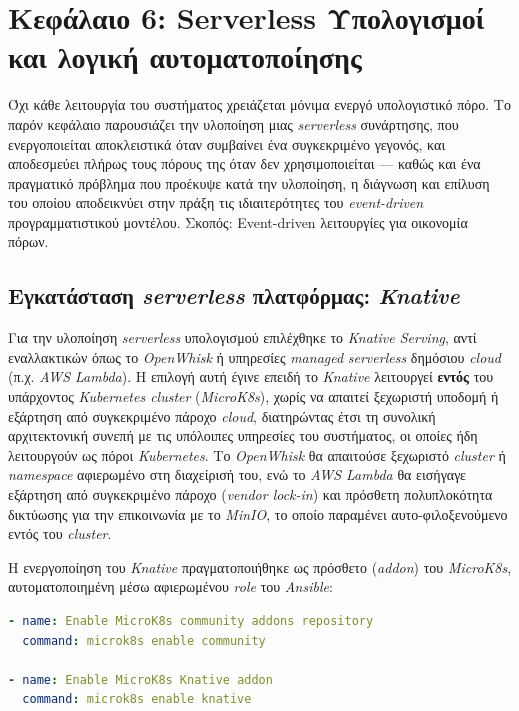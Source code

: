 \newpage

\section{Κεφάλαιο 6: Serverless Υπολογισμοί και λογική αυτοματοποίησης}

Όχι κάθε λειτουργία του συστήματος χρειάζεται μόνιμα ενεργό υπολογιστικό πόρο. Το παρόν κεφάλαιο παρουσιάζει την υλοποίηση μιας \textit{serverless} συνάρτησης, που ενεργοποιείται αποκλειστικά όταν συμβαίνει ένα συγκεκριμένο γεγονός, και αποδεσμεύει πλήρως τους πόρους της όταν δεν χρησιμοποιείται --- καθώς και ένα πραγματικό πρόβλημα που προέκυψε κατά την υλοποίηση, η διάγνωση και επίλυση του οποίου αποδεικνύει στην πράξη τις ιδιαιτερότητες του \textit{event-driven} προγραμματιστικού μοντέλου.
Σκοπός: Event-driven λειτουργίες για οικονομία πόρων.


\subsection{Εγκατάσταση \textit{serverless} πλατφόρμας: \textit{Knative}}

Για την υλοποίηση \textit{serverless} υπολογισμού επιλέχθηκε το \textit{Knative Serving}, αντί εναλλακτικών όπως το \textit{OpenWhisk} ή υπηρεσίες \textit{managed} \textit{serverless} δημόσιου \textit{cloud} (π.χ. \textit{AWS Lambda}). Η επιλογή αυτή έγινε επειδή το \textit{Knative} λειτουργεί \textbf{εντός} του υπάρχοντος \textit{Kubernetes cluster} (\textit{MicroK8s}), χωρίς να απαιτεί ξεχωριστή υποδομή ή εξάρτηση από συγκεκριμένο πάροχο \textit{cloud}, διατηρώντας έτσι τη συνολική αρχιτεκτονική συνεπή με τις υπόλοιπες υπηρεσίες του συστήματος, οι οποίες ήδη λειτουργούν ως πόροι \textit{Kubernetes}. Το \textit{OpenWhisk} θα απαιτούσε ξεχωριστό \textit{cluster} ή \textit{namespace} αφιερωμένο στη διαχείρισή του, ενώ το \textit{AWS Lambda} θα εισήγαγε εξάρτηση από συγκεκριμένο πάροχο (\textit{vendor lock-in}) και πρόσθετη πολυπλοκότητα δικτύωσης για την επικοινωνία με το \textit{MinIO}, το οποίο παραμένει αυτο-φιλοξενούμενο εντός του \textit{cluster}.

Η ενεργοποίηση του \textit{Knative} πραγματοποιήθηκε ως πρόσθετο (\textit{addon}) του \textit{MicroK8s}, αυτοματοποιημένη μέσω αφιερωμένου \textit{role} του \textit{Ansible}:

\begin{lstlisting}[language=yaml, caption={Ansible tasks για την ενεργοποίηση των MicroK8s addons}]
- name: Enable MicroK8s community addons repository
  command: microk8s enable community

- name: Enable MicroK8s Knative addon
  command: microk8s enable knative
\end{lstlisting}


